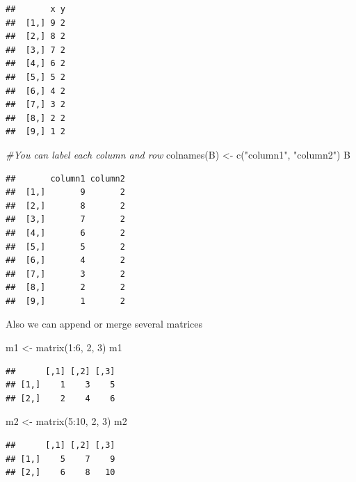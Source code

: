 \documentclass[
]{book}
\newenvironment{Shaded}{\begin{snugshade}}{\end{snugshade}}
\newcommand{\CommentTok}[1]{\textcolor[rgb]{0.56,0.35,0.01}{\textit{#1}}}
\newcommand{\DecValTok}[1]{\textcolor[rgb]{0.00,0.00,0.81}{#1}}
\newcommand{\FunctionTok}[1]{\textcolor[rgb]{0.00,0.00,0.00}{#1}}
\newcommand{\NormalTok}[1]{#1}
\newcommand{\OtherTok}[1]{\textcolor[rgb]{0.56,0.35,0.01}{#1}}
\newcommand{\SpecialCharTok}[1]{\textcolor[rgb]{0.00,0.00,0.00}{#1}}
\newcommand{\StringTok}[1]{\textcolor[rgb]{0.31,0.60,0.02}{#1}}
\begin{document}
\begin{verbatim}
##       x y
##  [1,] 9 2
##  [2,] 8 2
##  [3,] 7 2
##  [4,] 6 2
##  [5,] 5 2
##  [6,] 4 2
##  [7,] 3 2
##  [8,] 2 2
##  [9,] 1 2
\end{verbatim}

\begin{Shaded}
\begin{Highlighting}[]
\CommentTok{\#You can label each column and row}
\FunctionTok{colnames}\NormalTok{(B) }\OtherTok{\textless{}{-}} \FunctionTok{c}\NormalTok{(}\StringTok{"column1"}\NormalTok{, }\StringTok{"column2"}\NormalTok{)}
\NormalTok{B}
\end{Highlighting}
\end{Shaded}

\begin{verbatim}
##       column1 column2
##  [1,]       9       2
##  [2,]       8       2
##  [3,]       7       2
##  [4,]       6       2
##  [5,]       5       2
##  [6,]       4       2
##  [7,]       3       2
##  [8,]       2       2
##  [9,]       1       2
\end{verbatim}

Also we can append or merge several matrices

\begin{Shaded}
\begin{Highlighting}[]
\NormalTok{m1 }\OtherTok{\textless{}{-}} \FunctionTok{matrix}\NormalTok{(}\DecValTok{1}\SpecialCharTok{:}\DecValTok{6}\NormalTok{, }\DecValTok{2}\NormalTok{, }\DecValTok{3}\NormalTok{)}
\NormalTok{m1}
\end{Highlighting}
\end{Shaded}

\begin{verbatim}
##      [,1] [,2] [,3]
## [1,]    1    3    5
## [2,]    2    4    6
\end{verbatim}

\begin{Shaded}
\begin{Highlighting}[]
\NormalTok{m2 }\OtherTok{\textless{}{-}} \FunctionTok{matrix}\NormalTok{(}\DecValTok{5}\SpecialCharTok{:}\DecValTok{10}\NormalTok{, }\DecValTok{2}\NormalTok{, }\DecValTok{3}\NormalTok{)}
\NormalTok{m2}
\end{Highlighting}
\end{Shaded}

\begin{verbatim}
##      [,1] [,2] [,3]
## [1,]    5    7    9
## [2,]    6    8   10
\end{verbatim}
\end{document}
